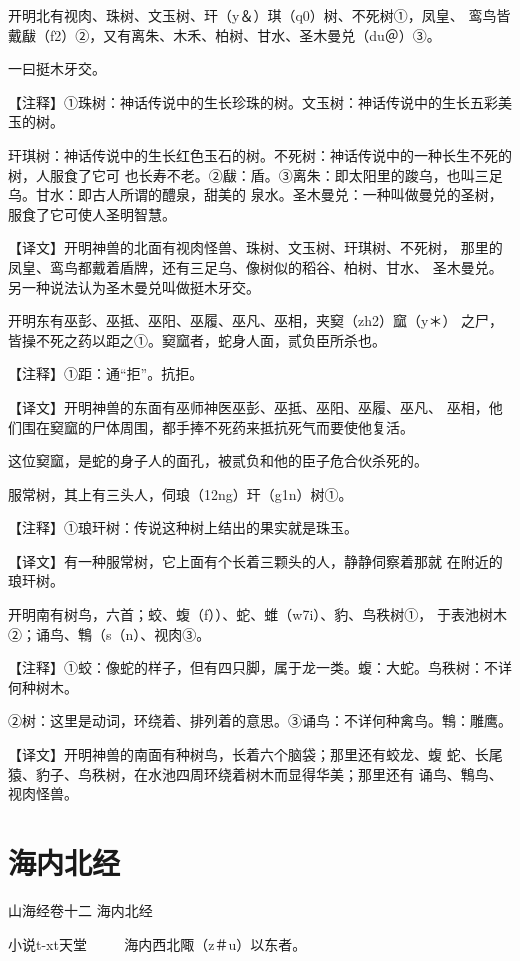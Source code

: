 \documentclass[a4paper,12pt,UTF8,twoside]{ctexbook}
\begin{document}
开明北有视肉、珠树、文玉树、玕（y＆）琪（q0）树、不死树①，凤皇、 鸾鸟皆戴瞂（f2）②，又有离朱、木禾、柏树、甘水、圣木曼兑（du＠）③。

一曰挺木牙交。

【注释】①珠树：神话传说中的生长珍珠的树。文玉树：神话传说中的生长五彩美玉的树。

玕琪树：神话传说中的生长红色玉石的树。不死树：神话传说中的一种长生不死的树，人服食了它可 也长寿不老。②瞂：盾。③离朱：即太阳里的踆乌，也叫三足乌。甘水：即古人所谓的醴泉，甜美的 泉水。圣木曼兑：一种叫做曼兑的圣树，服食了它可使人圣明智慧。

【译文】开明神兽的北面有视肉怪兽、珠树、文玉树、玕琪树、不死树， 那里的凤皇、鸾鸟都戴着盾牌，还有三足乌、像树似的稻谷、柏树、甘水、 圣木曼兑。另一种说法认为圣木曼兑叫做挺木牙交。

开明东有巫彭、巫抵、巫阳、巫履、巫凡、巫相，夹窫（zh2）窳（y＊） 之尸，皆操不死之药以距之①。窫窳者，蛇身人面，贰负臣所杀也。

【注释】①距：通“拒”。抗拒。

【译文】开明神兽的东面有巫师神医巫彭、巫抵、巫阳、巫履、巫凡、 巫相，他们围在窫窳的尸体周围，都手捧不死药来抵抗死气而要使他复活。

这位窫窳，是蛇的身子人的面孔，被贰负和他的臣子危合伙杀死的。

服常树，其上有三头人，伺琅（12ng）玕（g1n）树①。

【注释】①琅玕树：传说这种树上结出的果实就是珠玉。

【译文】有一种服常树，它上面有个长着三颗头的人，静静伺察着那就 在附近的琅玕树。

开明南有树鸟，六首；蛟、蝮（f））、蛇、蜼（w7i）、豹、鸟秩树①， 于表池树木②；诵鸟、鶽（s（n）、视肉③。

【注释】①蛟：像蛇的样子，但有四只脚，属于龙一类。蝮：大蛇。鸟秩树：不详何种树木。

②树：这里是动词，环绕着、排列着的意思。③诵鸟：不详何种禽鸟。鶽：雕鹰。

【译文】开明神兽的南面有种树鸟，长着六个脑袋；那里还有蛟龙、蝮 蛇、长尾猿、豹子、鸟秩树，在水池四周环绕着树木而显得华美；那里还有 诵鸟、鶽鸟、视肉怪兽。

\chapter{海内北经}

山海经卷十二 海内北经

小说t-xt天堂　  　
海内西北陬（z＃u）以东者。
\end{document}

